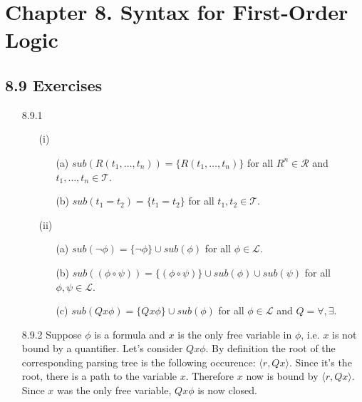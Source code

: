 
\chapter{Chapter 8. Syntax for First-Order Logic}

\section*{8.9 Exercises}

\begin{enumerate}

  \item[8.9.1]
    \begin{enumerate}
      \item[(i)] \begin{enumerate}
                   \item[(a)]
                     $sub(R(t_1, \dots, t_n)) = \{R(t_1, \dots, t_n)\}$ for all $R^n \in \mathcal{R}$ and \\ $t_1, \dots, t_n \in \mathcal{T}$.
                   \item[(b)]
                     $sub(t_1 = t_2) = \{t_1 = t_2\}$ for all $t_1, t_2 \in \mathcal{T}$.
                 \end{enumerate}
      \item[(ii)] \begin{enumerate}
                    \item[(a)]
                      $sub(\neg \phi) = \{\neg \phi\} \cup sub(\phi)$ for all $\phi \in \mathcal L$.
                    \item[(b)]
                      $sub((\phi \circ \psi)) = \{(\phi \circ \psi)\} \cup sub(\phi) \cup sub(\psi)$ for all $\phi, \psi \in \mathcal L$.
                    \item[(c)]
                      $sub(Qx \phi) = \{Qx\phi\} \cup sub(\phi)$ for all $\phi \in \mathcal L$ and $Q = \forall, \exists$.\\
                  \end{enumerate}
    \end{enumerate}

  \item[8.9.2]
    Suppose $\phi$ is a formula and $x$ is the only free variable in $\phi$, i.e. $x$ is not bound by a quantifier.
    Let's consider $Qx\phi$.
    By definition the root of the corresponding parsing tree is the following occurence: $\langle r, Qx \rangle$.
    Since it's the root, there is a path to the variable $x$.
    Therefore $x$ now is bound by $\langle r, Qx \rangle$.
    Since $x$ was the only free variable, $Qx\phi$ is now closed.\\


\end{enumerate}
